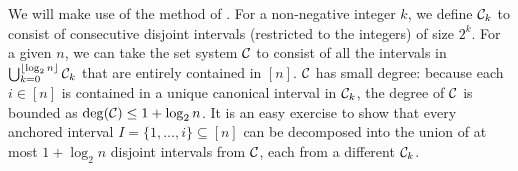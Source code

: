 We will make use of the method of . For a non-negative
integer \(k\), we define $\mathcal{C}_k$ to consist of consecutive disjoint intervals (restricted to the integers) of size $2^k$. For a given \(n\), we can take the set
system \(\mathcal{C}\) to consist of all the intervals in
\(
\bigcup_{k = 0}^{\lfloor \log_2 n \rfloor}\mathcal{C}_k
\)
that are entirely contained in \([n]\). \(\mathcal{C}\) has small degree:
because each \(i\in [n]\) is contained in a unique canonical interval
in \(\mathcal{C}_k\), the degree of \(\mathcal{C}\) is bounded as \(\operatorname{deg}(\mathcal{C}) \le 1+ \log_2 n\). It is an easy exercise to show that every anchored interval $I = \{1, \ldots, i\} \subseteq [n]$ can be decomposed into the union of at most $1 + \log_2 n$ disjoint intervals from $\mathcal{C}$, each from a different $\mathcal{C}_k$.






